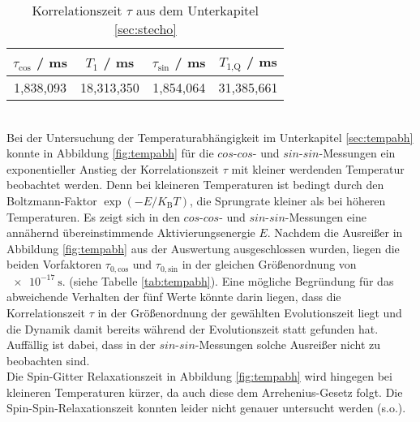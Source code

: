 \begin{table}
  \centering
  \caption{Korrelationszeit $\tau$ aus dem Unterkapitel \ref{sec:stecho}}
  \label{tab:tau}
  \begin{tabular}{S S S S}
    \toprule
    {$\tau_{\text{cos}}$ / ms} & {$T_1$ / ms} & {$\tau_{\text{sin}}$ / ms} & {$T_{1\text{,Q}}$ / ms}\\
    \midrule
    {1,838,093} & {18,313,350} & {1,854,064} & {31,385,661}\\
    \bottomrule
  \end{tabular}
\end{table}
\noindent
\\
Bei der Untersuchung der Temperaturabhängigkeit im Unterkapitel \ref{sec:tempabh}
konnte in Abbildung \ref{fig:tempabh} für die $cos$-$cos$- und $sin$-$sin$-Messungen
ein exponentieller Anstieg der Korrelationszeit $\tau$ mit kleiner werdenden Temperatur
beobachtet werden. Denn bei kleineren Temperaturen ist bedingt durch den
Boltzmann-Faktor $\exp{(-E/K_{\text{B}}T)}$, die Sprungrate kleiner als bei
höheren Temperaturen. Es zeigt sich in den $cos$-$cos$- und $sin$-$sin$-Messungen
eine annähernd übereinstimmende Aktivierungsenergie $E$.
Nachdem die Ausreißer in Abbildung \ref{fig:tempabh} aus der Auswertung ausgeschlossen
wurden, liegen die beiden Vorfaktoren $\tau_{0,\text{cos}}$ und $\tau_{0,\text{sin}}$
in der gleichen Größenordnung von $\SI{e-17}{\second}$. (siehe Tabelle \ref{tab:tempabh}).
Eine mögliche Begründung für das abweichende Verhalten der fünf Werte könnte darin liegen,
dass die Korrelationszeit $\tau$ in der Größenordnung der gewählten Evolutionszeit
liegt und die Dynamik damit bereits während der Evolutionszeit statt gefunden hat.
Auffällig ist dabei, dass in der $sin$-$sin$-Messungen solche Ausreißer nicht zu
beobachten sind.\\
Die Spin-Gitter Relaxationszeit in Abbildung \ref{fig:tempabh} wird hingegen bei
kleineren Temperaturen kürzer, da auch diese dem Arrehenius-Gesetz folgt. Die
Spin-Spin-Relaxationszeit konnten leider nicht genauer untersucht werden (s.o.).

